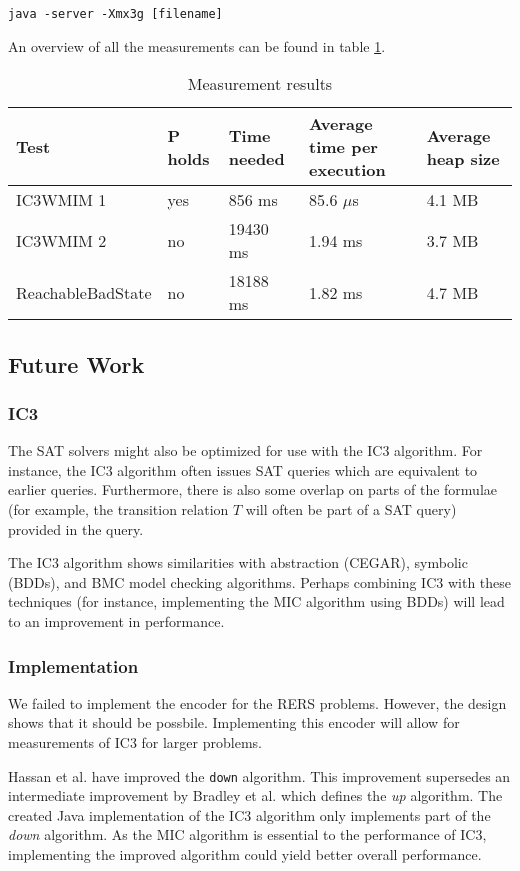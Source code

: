 \documentclass[a4paper]{article}
\begin{document}
\texttt{java -server -Xmx3g [filename]}

An overview of all the measurements can be found in table \ref{tab:measurements}.

\begin{table}
\begin{tabularx}{\linewidth}{lllXl}
Test & P holds & Time needed & Average time per execution & Average heap size\\\hline
IC3WMIM 1 & yes & 856 ms & 85.6 $\mu$s & 4.1 MB\\
IC3WMIM 2 & no & 19430 ms & 1.94 ms & 3.7 MB\\
ReachableBadState & no & 18188 ms & 1.82 ms & 4.7 MB
\end{tabularx}
\label{tab:measurements}
\caption{Measurement results}
\end{table}

\subsection{Future Work}
\subsubsection{IC3}
The SAT solvers might also be optimized for use with the IC3 algorithm. For instance, the IC3 algorithm often issues SAT queries which are equivalent to earlier queries. Furthermore, there is also some overlap on parts of the formulae (for example, the transition relation $T$ will often be part of a SAT query) provided in the query.

The IC3 algorithm shows similarities with abstraction (CEGAR), symbolic (BDDs), and BMC model checking algorithms. Perhaps combining IC3 with these techniques (for instance, implementing the MIC algorithm using BDDs) will lead to an improvement in performance.

\subsubsection{Implementation}
We failed to implement the encoder for the RERS problems. However, the design shows that it should be possbile. Implementing this encoder will allow for measurements of IC3 for larger problems.

Hassan et al. \cite{Hassan2013} have improved the \texttt{down} algorithm. This improvement supersedes an intermediate improvement by Bradley et al. \cite{Bradley2007} which defines the \emph{up} algorithm. The created Java implementation of the IC3 algorithm only implements part of the \emph{down} algorithm. As the MIC algorithm is essential to the performance of IC3, implementing the improved algorithm could yield better overall performance.
\end{document}
